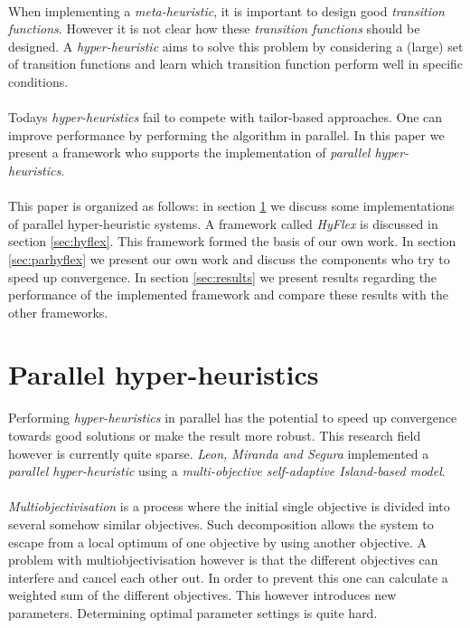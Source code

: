 \documentclass[a4paper,10pt]{article}
\newcommand{\seclab}[1]{\label{sec:#1}}
\newcommand{\secref}[1]{\ref{sec:#1}}
\theoremstyle{definition}
\begin{document}
\paragraph{}
When implementing a \emph{meta-heuristic}, it is important to design good \emph{transition functions}. However it is not clear how these \emph{transition functions} should be designed. A \emph{hyper-heuristic} aims to solve this problem by considering a (large) set of transition functions and learn which transition function perform well in specific conditions.

\paragraph{}
Todays \emph{hyper-heuristics} fail to compete with tailor-based approaches. One can improve performance by performing the algorithm in parallel. In this paper we present a framework who supports the implementation of \emph{parallel hyper-heuristics}.%

\paragraph{}
This paper is organized as follows: in section \secref{parhyp} we discuss some implementations of parallel hyper-heuristic systems. A framework called \emph{HyFlex} is discussed in section \secref{hyflex}. This framework formed the basis of our own work. In section \secref{parhyflex} we present our own work and discuss the components who try to speed up convergence. In section \secref{results} we present results regarding the performance of the implemented framework and compare these results with the other frameworks.%

\section{Parallel hyper-heuristics}
\seclab{parhyp}

Performing \emph{hyper-heuristics} in parallel has the potential to speed up convergence towards good solutions or make the result more robust. This research field however is currently quite sparse. \emph{Leon, Miranda and Segura}\cite{} implemented a \emph{parallel hyper-heuristic} using a \emph{multi-objective self-adaptive Island-based model}.

\paragraph{}
\emph{Multiobjectivisation} is a process where the initial single objective is divided into several somehow similar objectives. Such decomposition allows the system to escape from a local optimum of one objective by using another objective. A problem with multiobjectivisation however is that the different objectives can interfere and cancel each other out. In order to prevent this one can calculate a weighted sum of the different objectives. This however introduces new parameters. Determining optimal parameter settings is quite hard.
\end{document}
